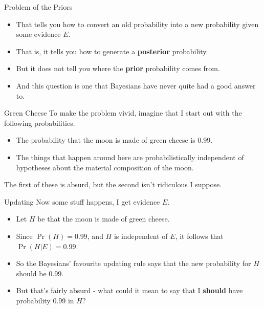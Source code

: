 \documentclass[
  ignorenonframetext,
]{beamer}
\providecommand{\tightlist}{%
  \setlength{\itemsep}{0pt}\setlength{\parskip}{0pt}}
\renewcommand{\,}{\text{, }}
\begin{document}
\begin{frame}{Problem of the Priors}
\protect\hypertarget{problem-of-the-priors}{}
\begin{itemize}
\tightlist
\item
  That tells you how to convert an old probability into a new
  probability given some evidence \(E\).
\item
  That is, it tells you how to generate a \textbf{posterior}
  probability. \pause
\item
  But it does not tell you where the \textbf{prior} probability comes
  from.
\item
  And this question is one that Bayesians have never quite had a good
  answer to.
\end{itemize}
\end{frame}

\begin{frame}{Green Cheese}
\protect\hypertarget{green-cheese}{}
To make the problem vivid, imagine that I start out with the following
probabilities.

\begin{itemize}
\tightlist
\item
  The probability that the moon is made of green cheese is 0.99.
\item
  The things that happen around here are probabilistically independent
  of hypotheses about the material composition of the moon.
\end{itemize}

The first of these is absurd, but the second isn't ridiculous I suppose.
\end{frame}

\begin{frame}{Updating}
\protect\hypertarget{updating}{}
Now some stuff happens, I get evidence \(E\).

\begin{itemize}
\tightlist
\item
  Let \(H\) be that the moon is made of green cheese.
\item
  Since \(\Pr(H) = 0.99\), and \(H\) is independent of \(E\), it follows
  that \(\Pr(H | E) = 0.99\). \pause
\item
  So the Bayesians' favourite updating rule says that the new
  probability for \(H\) should be 0.99. \pause
\item
  But that's fairly absurd - what could it mean to say that I
  \textbf{should} have probability 0.99 in \(H\)?
\end{itemize}
\end{frame}
\end{document}
